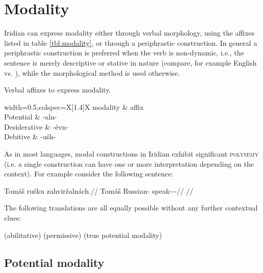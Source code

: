 \section{Modality}\label{sec:modality}

Iridian can express modality either through verbal morphology, using the affixes
listed in table \ref{tbl:modality}, or through a periphrastic construction. In
general a periphrastic construction is preferred when the verb is non-dynamic,
i.e., the sentence is merely descriptive or stative in nature (compare, for
example English  vs. ), while the morphological method is used otherwise.

\begin{table}
    \footnotesize\sffamily
    \caption{Verbal affixes to express modality.}
    \medskip
    \label{tbl:modality}
	\begin{tblr}{width=0.5\textwidth,colspec={X[1.4]X}}
			\toprule 
			{\sc modality} & {\sc affix} \\ 
			\midrule 
				Potential & -aln- \\ 
				Desiderative & -évn- \\ 
				Debitive & -ušh- \\ 
			\bottomrule
    \end{tblr}
\end{table}

As in most languages, modal constructions in Iridian exhibit significant
{\scshape polysemy} (i.e. a single construction can have one or
more interpretation depending on the context). For example consider the
following sentence:

\pex
\begingl
\gla Tomáš rušku zahviržalnách.//
\glb Tomáš Russian-\Ins{} speak-\Av{}-\Pot{}-\Ctp{}//
\glft {}//
\endgl
\xe

The following translations are all equally possible without any further
contextual clues:

\pex
\a {} (abilitative)
\a {} (permissive)
\a {} (true potential modality)
\xe


\subsection{Potential modality}\label{sec:potential}

